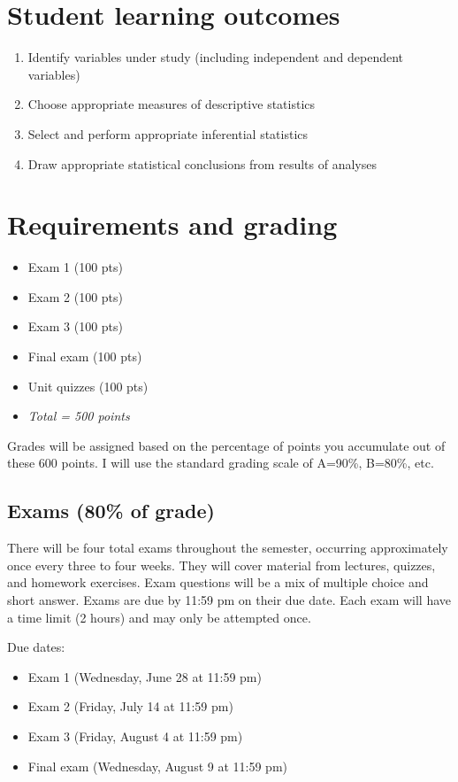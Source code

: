 \documentclass[10pt]{article}
\begin{document}
\section*{Student learning outcomes}
\label{sec-4}
\begin{enumerate}
\item Identify variables under study (including independent and dependent variables)
\item Choose appropriate measures of descriptive statistics
\item Select and perform appropriate inferential statistics
\item Draw appropriate statistical conclusions from results of analyses
\end{enumerate}

\section*{Requirements and grading}
\label{sec-5}
\begin{itemize}
\item Exam 1 (100 pts)
\item Exam 2 (100 pts)
\item Exam 3 (100 pts)
\item Final exam (100 pts)
\item Unit quizzes (100 pts)
\item \emph{Total = 500 points}
\end{itemize}

Grades will be assigned based on the percentage of points you accumulate out of these 600 points.  I will use the standard grading scale of A=90\%, B=80\%, etc.

\subsection*{Exams (80\% of grade)}
\label{sec-5-1}
There will be four total exams throughout the semester, occurring approximately once every three to four weeks.  They will cover material from lectures, quizzes, and homework exercises.  Exam questions will be a mix of multiple choice and short answer.  Exams are due by 11:59 pm on their due date.  Each exam will have a time limit (2 hours) and may only be attempted once.

Due dates:

\begin{itemize}
\item Exam 1 (Wednesday, June 28 at 11:59 pm)
\item Exam 2 (Friday, July 14 at 11:59 pm)
\item Exam 3 (Friday, August 4 at 11:59 pm)
\item Final exam (Wednesday, August 9 at 11:59 pm)
\end{itemize}
\end{document}
